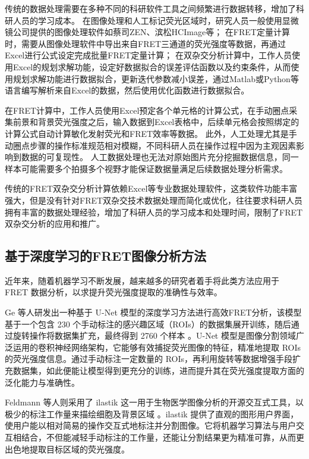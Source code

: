 传统的数据处理需要在多种不同的科研软件工具之间频繁进行数据转移，增加了科研人员的学习成本。
在图像处理和人工标记荧光区域时，研究人员一般使用显微镜公司提供的图像处理软件如蔡司ZEN、滨松HCImage等；
在FRET定量计算时，需要从图像处理软件中导出来自FRET三通道的荧光强度等数据，再通过Excel进行公式设定完成批量FRET定量计算；
在双杂交分析计算中，工作人员使用Excel的规划求解功能，设定好数据拟合的误差评估函数以及约束条件，从而使用规划求解功能进行数据拟合，更新迭代参数减小误差，通过Matlab或Python等语言编写解析来自Excel的数据，然后使用优化函数进行数据拟合。

在FRET计算中，工作人员使用Excel预定各个单元格的计算公式，在手动圈点采集前景和背景荧光强度之后，输入数据到Excel表格中，后续单元格会按照绑定的计算公式自动计算敏化发射荧光和FRET效率等数据。
此外，人工处理尤其是手动圈点步骤的操作标准规范相对模糊，不同科研人员在操作过程中因为主观因素影响到数据的可复现性。
人工数据处理也无法对原始图片充分挖掘数据信息，同一样本可能需要多个拍摄多个视野才能保证数据量满足后续数据处理分析需求。

传统的FRET双杂交分析计算依赖Excel等专业数据处理软件，这类软件功能丰富强大，但是没有针对FRET双杂交技术数据处理而简化或优化，往往要求科研人员拥有丰富的数据处理经验，增加了科研人员的学习成本和处理时间，限制了FRET双杂交分析的应用和推广。
\fi

\subsection{基于深度学习的FRET图像分析方法}

\ifshowtext
近年来，随着机器学习不断发展，越来越多的研究者着手将此类方法应用于 FRET 数据分析，以求提升荧光强度提取的准确性与效率。

Ge 等人研发出一种基于 U-Net  模型的深度学习方法进行高效FRET分析，该模型基于一个包含 230 个手动标注的感兴趣区域（ROIs）的数据集展开训练，随后通过旋转操作将数据集扩充，最终得到 2760 个样本 。U-Net 模型是图像分割领域广泛运用的卷积神经网络架构，它能够有效捕捉荧光图像的特征，精准地提取 ROIs 的荧光强度信息。通过手动标注一定数量的 ROIs，再利用旋转等数据增强手段扩充数据集，如此便能让模型得到更充分的训练，进而提升其在荧光强度提取方面的泛化能力与准确性。

Feldmann 等人则采用了 ilastik  这一用于生物医学图像分析的开源交互式工具，以极少的标注工作量来描绘细胞及背景区域 。ilastik 提供了直观的图形用户界面，使用户能以相对简易的操作交互式地标注并分割图像。它将机器学习算法与用户交互相结合，不但能减轻手动标注的工作量，还能让分割结果更为精准可靠，从而更出色地提取目标区域的荧光强度。

